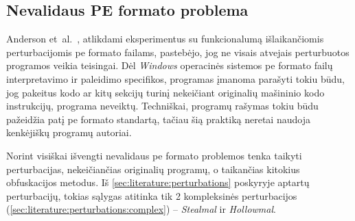 \subsection{Nevalidaus PE formato problema}\label{sec:literature:pe_invalid}

Anderson et~al.~\cite{andersonLearningEvadeStatic2018}, atlikdami eksperimentus su funkcionalumą išlaikančiomis perturbacijomis \gls{pe} formato failams, pastebėjo, jog ne visais atvejais perturbuotos programos veikia teisingai. Dėl \textit{Windows} operacinės sistemos \gls{pe} formato failų interpretavimo ir paleidimo specifikos, programas įmanoma parašyti tokiu būdu, jog pakeitus kodo ar kitų sekcijų turinį nekeičiant originalių mašininio kodo instrukcijų, programa neveiktų. Techniškai, programų rašymas tokiu būdu pažeidžia patį \gls{pe} formato standartą, tačiau šią praktiką neretai naudoja kenkėjiškų programų autoriai.

Norint visiškai išvengti nevalidaus \gls{pe} formato problemos tenka taikyti perturbacijas, nekeičiančias originalių programų, o taikančias kitokius obfuskacijos metodus. Iš \ref{sec:literature:perturbations} poskyryje aptartų perturbacijų, tokias sąlygas atitinka tik 2 kompleksinės perturbacijos (\ref{sec:literature:perturbations:complex}) -- \textit{Stealmal} ir \textit{Hollowmal}.